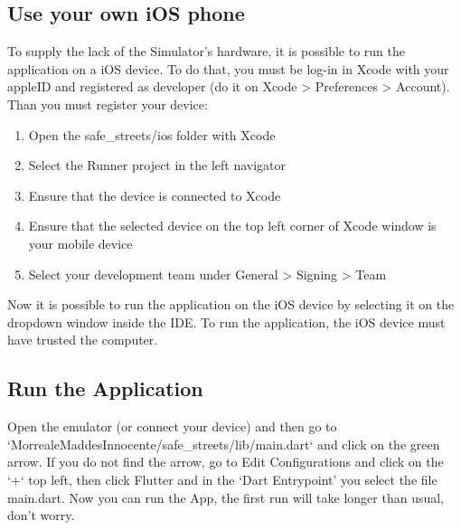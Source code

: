 \documentclass[../ITD.tex]{subfiles}
\begin{document}
    \subsection{Use your own iOS phone}\label{subsec:use-your-own-ios-phone}
    To supply the lack of the Simulator's hardware, it is possible to run the application on a iOS device.
    To do that, you must be log-in in Xcode with your appleID and registered as developer (do it on Xcode > Preferences > Account).
    Than you must register your device:
    \begin{enumerate}
        \item Open the safe_streets/ios folder with Xcode
        \item Select the Runner project in the left navigator
        \item Ensure that the device is connected to Xcode
        \item Ensure that the selected device on the top left corner of Xcode window is your mobile device
        \item Select your development team under General > Signing > Team
    \end{enumerate}
    Now it is possible to run the application on the iOS device by selecting it on the dropdown window inside the IDE.
    To run the application, the iOS device must have trusted the computer.


    \subsection{Run the Application}\label{subsec:run-the-application}
    Open the emulator (or connect your device) and then go to\newline
    `MorrealeMaddesInnocente/safe\_streets/lib/main.dart` and click on the green arrow.
    If you do not find the arrow, go to Edit Configurations and click on the `+` top left,
    then click Flutter and in the `Dart Entrypoint' you select the file main.dart.
    Now you can run the App, the first run will take longer than usual, don't worry.
\end{document}
